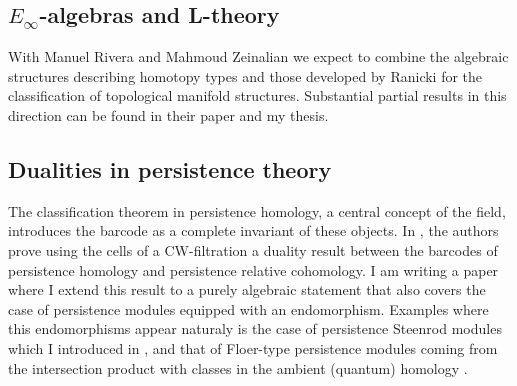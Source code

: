 \subsection{$E_\infty$-algebras and L-theory} With Manuel Rivera and Mahmoud Zeinalian we expect to combine the algebraic structures describing homotopy types \cite{sullivan1977infinitesimal, mandell2001padic} and those developed by Ranicki \cite{ranicki1992topological}  for the classification of topological manifold structures.
Substantial partial results in this direction can be found in their paper \cite{rivera2019functor} and my thesis.

\subsection{Dualities in persistence theory} The classification theorem in persistence homology, a central concept of the field, introduces the barcode as a complete invariant of these objects.
In \cite{de2011dualities}, the authors prove using the cells of a CW-filtration a duality result between the barcodes of persistence homology and persistence relative cohomology.
I am writing a paper where I extend this result to a purely algebraic statement that also covers the case of persistence modules equipped with an endomorphism.
Examples where this endomorphisms appear naturaly is the case of persistence Steenrod modules which I introduced in \cite{medina2018persistence}, and that of Floer-type persistence modules  coming  from  the  intersection  product  with  classes  in  the  ambient (quantum) homology \cite{polterovich2017persistence}.